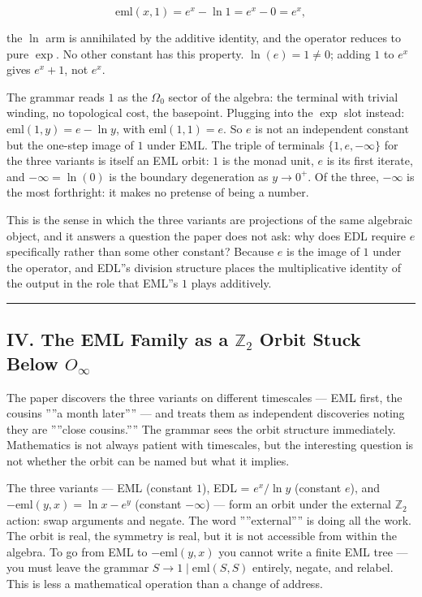 \documentclass[12pt,a4paper]{article}
\begin{document}
\[\text{eml}(x, 1) = e^x - \ln 1 = e^x - 0 = e^x,\]


the $\ln$ arm is annihilated by the additive identity, and the operator reduces
to pure $\exp$. No other constant has this property. $\ln(e) = 1 \neq 0$; adding
$1$ to $e^x$ gives $e^x + 1$, not $e^x$.

The grammar reads $1$ as the $\Omega_0$ sector of the algebra: the terminal with
trivial winding, no topological cost, the basepoint. Plugging into the $\exp$ slot
instead: $\text{eml}(1, y) = e - \ln y$, with $\text{eml}(1,1) = e$. So $e$ is
not an independent constant but the one-step image of $1$ under EML. The triple
of terminals $\{1, e, -\infty\}$ for the three variants is itself an EML orbit:
$1$ is the monad unit, $e$ is its first iterate, and $-\infty = \ln(0)$ is the
boundary degeneration as $y \to 0^+$. Of the three, $-\infty$ is the most
forthright: it makes no pretense of being a number.

This is the sense in which the three variants are projections of the same
algebraic object, and it answers a question the paper does not ask: why does EDL
require $e$ specifically rather than some other constant? Because $e$ is the image
of $1$ under the operator, and EDL''s division structure places the multiplicative
identity of the output in the role that EML''s $1$ plays additively.

\begin{center}
\rule{0.5\textwidth}{0.4pt}
\end{center}

\subsection{IV. The EML Family as a $\mathbb{Z}_2$ Orbit Stuck Below $O_{\infty}$}

The paper discovers the three variants on different timescales --- EML first, the
cousins ''''a month later'''' --- and treats them as independent discoveries noting they
are ''''close cousins.'''' The grammar sees the orbit structure immediately. Mathematics
is not always patient with timescales, but the interesting question is not whether
the orbit can be named but what it implies.

The three variants --- EML (constant $1$), EDL = $e^x/\ln y$ (constant $e$), and
$-\text{eml}(y,x) = \ln x - e^y$ (constant $-\infty$) --- form an orbit under the
external $\mathbb{Z}_2$ action: swap arguments and negate. The word ''''external'''' is
doing all the work. The orbit is real, the symmetry is real, but it is not
accessible from within the algebra. To go from EML to $-\text{eml}(y,x)$ you
cannot write a finite EML tree --- you must leave the grammar $S \to 1 \mid
\text{eml}(S,S)$ entirely, negate, and relabel. This is less a mathematical
operation than a change of address.
\end{document}

